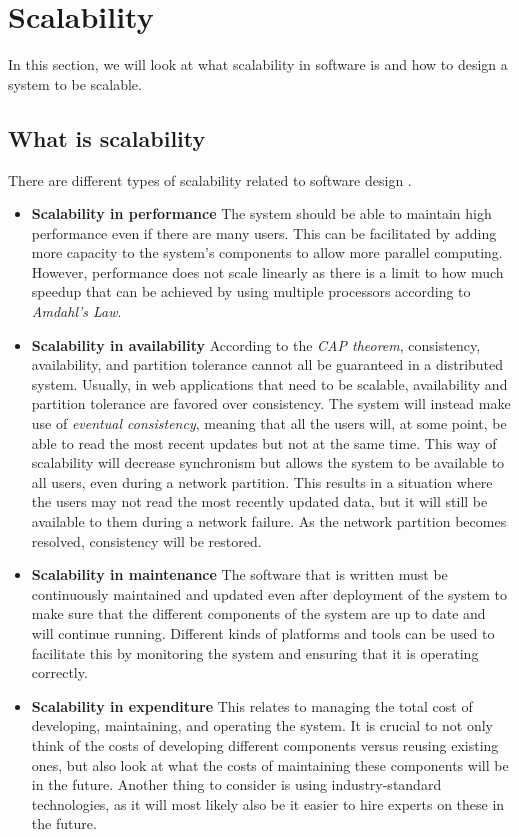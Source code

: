 \section{Scalability}\label{sec:scalability}
In this section, we will look at what scalability in software is and how to design a system to be scalable. 

\subsection{What is scalability}
There are different types of scalability related to software design \cite{ScalabilityDesignPrinciples}.
\begin{itemize}
    \item \textbf{Scalability in performance} The system should be able to maintain high performance even if there are many users. This can be facilitated by adding more capacity to the system's components to allow more parallel computing. 
    However, performance does not scale linearly as there is a limit to how much speedup that can be achieved by using multiple processors according to \textit{Amdahl's Law}. 
    \item \textbf{Scalability in availability} According to the \textit{CAP theorem}, consistency, availability, and partition tolerance cannot all be guaranteed in a distributed system. 
    Usually, in web applications that need to be scalable, availability and partition tolerance are favored over consistency. 
    The system will instead make use of \textit{eventual consistency}, meaning that all the users will, at some point, be able to read the most recent updates but not at the same time. 
    This way of scalability will decrease synchronism but allows the system to be available to all users, even during a network partition.
    This results in a situation where the users may not read the most recently updated data, but it will still be available to them during a network failure. As the network partition becomes resolved, consistency will be restored.
    \item \textbf{Scalability in maintenance} The software that is written must be continuously maintained and updated even after deployment of the system to make sure that the different components of the system are up to date and will continue running. 
    Different kinds of platforms and tools can be used to facilitate this by monitoring the system and ensuring that it is operating correctly. 
    \item \textbf{Scalability in expenditure} This relates to managing the total cost of developing, maintaining, and operating the system. 
    It is crucial to not only think of the costs of developing different components versus reusing existing ones, but also look at what the costs of maintaining these components will be in the future. 
    Another thing to consider is using industry-standard technologies, as it will most likely also be it easier to hire experts on these in the future.
\end{itemize}

